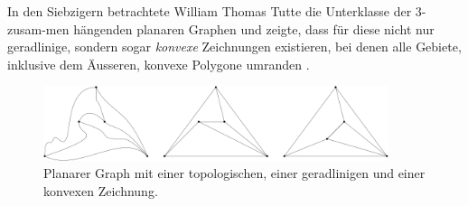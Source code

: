In den Siebzigern betrachtete William Thomas Tutte die Unterklasse der 3-zusam-men hängenden planaren Graphen und zeigte, dass für diese nicht nur geradlinige, sondern sogar \textit{konvexe} Zeichnungen existieren, bei denen alle Gebiete, inklusive dem Äusseren, konvexe Polygone umranden \cite{tutte63}.

\begin{figure}
	\centering
  \includegraphics[width=0.9\textwidth]{topo_straight_convex.png}
	\caption{Planarer Graph mit einer topologischen, einer geradlinigen und einer konvexen Zeichnung.}
	\label{topo_straight_convex}
\end{figure}



